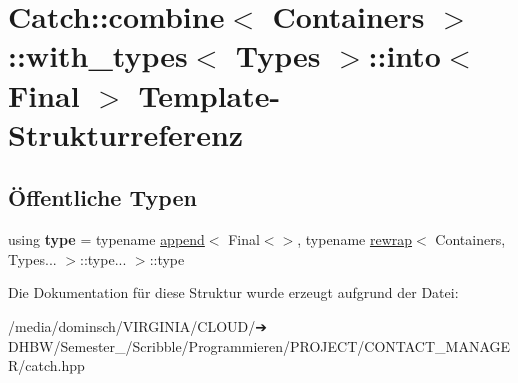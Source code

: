 \hypertarget{structCatch_1_1combine_1_1with__types_1_1into}{}\section{Catch\+:\+:combine$<$ Containers $>$\+:\+:with\+\_\+types$<$ Types $>$\+:\+:into$<$ Final $>$ Template-\/\+Strukturreferenz}
\label{structCatch_1_1combine_1_1with__types_1_1into}
\subsection*{Öffentliche Typen}
\begin{DoxyCompactItemize}
\item 
\mbox{\label{structCatch_1_1combine_1_1with__types_1_1into_a62e7f47f468f2aedf969fb201b68bb81}} 
using {\bfseries type} = typename \hyperlink{structCatch_1_1append}{append}$<$ Final$<$$>$, typename \hyperlink{structCatch_1_1rewrap}{rewrap}$<$ Containers, Types... $>$\+::type... $>$\+::type
\end{DoxyCompactItemize}


Die Dokumentation für diese Struktur wurde erzeugt aufgrund der Datei\+:\begin{DoxyCompactItemize}
\item 
/media/dominsch/\+V\+I\+R\+G\+I\+N\+I\+A/\+C\+L\+O\+U\+D/➔ D\+H\+B\+W/\+Semester\+\_/\+Scribble/\+Programmieren/\+P\+R\+O\+J\+E\+C\+T/\+C\+O\+N\+T\+A\+C\+T\+\_\+\+M\+A\+N\+A\+G\+E\+R/catch.\+hpp\end{DoxyCompactItemize}
